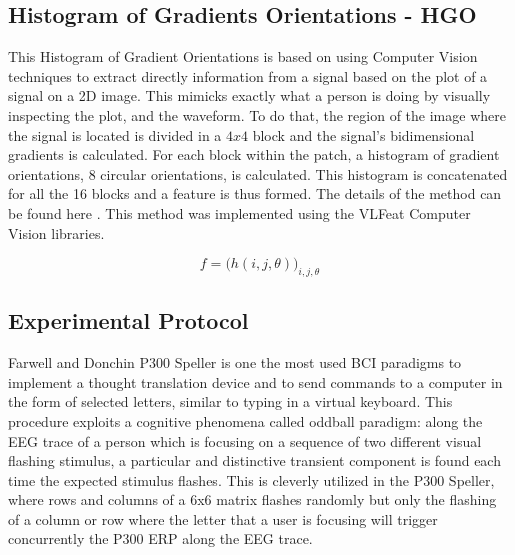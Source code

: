 \documentclass[brainsci,article,submit,moreauthors,pdftex,10pt,a4paper]{mdpi}
\begin{document}
\subsection{Histogram of Gradients Orientations - HGO}

This Histogram of Gradient Orientations is based on using Computer Vision techniques to extract directly information from a signal based on the plot of a signal on a 2D image.  This mimicks exactly what a person is doing by visually inspecting the plot, and the waveform.  To do that, the region of the image where the signal is located is divided in a $4 x 4$ block and the signal's bidimensional gradients is calculated.  For each block within the patch, a histogram of gradient orientations, 8 circular orientations, is calculated.  This histogram is concatenated for all the 16 blocks and a feature is thus formed.  The details of the method can be found here \citep{Ramele2016}.  This method was implemented using the VLFeat  \citep{Vedaldi2010} Computer Vision libraries.

\begin{equation}
f = {\bigg ( h(i,j,\theta) \bigg )}_{i,j,\theta}
\label{eq:multiclassificationrow}
\end{equation}



\subsection{Experimental Protocol}
\label{Experimental}

Farwell and Donchin P300 Speller \citep{Farwell1988} is one the most used BCI paradigms to implement a thought translation device and to send commands to a computer in the form of selected letters, similar to typing in a virtual keyboard.  This procedure exploits a cognitive phenomena called oddball paradigm: along the EEG trace of a person which is focusing on a sequence of two different visual flashing stimulus, a particular and distinctive transient component is found each time the expected stimulus flashes.  This is cleverly utilized in the P300 Speller, where rows and columns of a 6x6 matrix flashes randomly but only the flashing of a column or row where the letter that a user is focusing will trigger concurrently the P300 ERP along the EEG trace.
\end{document}

